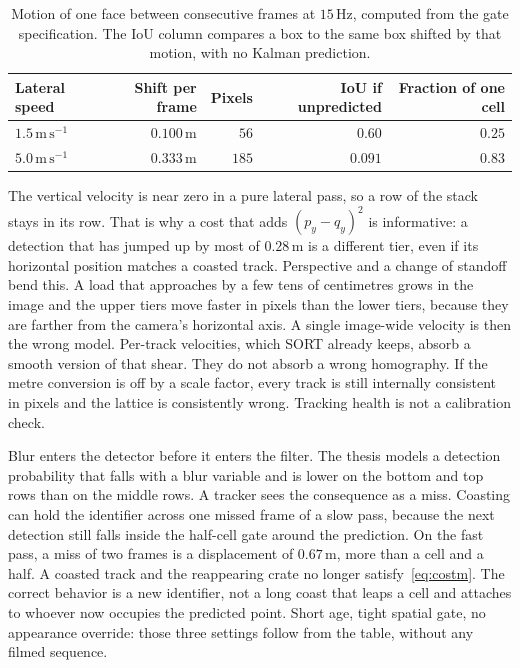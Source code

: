 \documentclass[11pt,a4paper]{article}
\begin{document}
\begin{table}[t]
\centering
\small
\begin{tabular}{lrrrr}
\toprule
Lateral speed & Shift per frame & Pixels & IoU if unpredicted & Fraction of one cell \\
\midrule
$1.5\,\mathrm{m\,s^{-1}}$ & $0.100\,\mathrm{m}$ & $56$ & $0.60$ & $0.25$ \\
$5.0\,\mathrm{m\,s^{-1}}$ & $0.333\,\mathrm{m}$ & $185$ & $0.091$ & $0.83$ \\
\bottomrule
\end{tabular}
\caption{Motion of one face between consecutive frames at $15\,\mathrm{Hz}$, computed from the gate specification. The IoU column compares a box to the same box shifted by that motion, with no Kalman prediction.}
\label{tab:motion}
\end{table}

The vertical velocity is near zero in a pure lateral pass, so a row of the stack stays in its row. That is why a cost that adds $(p_y-q_y)^2$ is informative: a detection that has jumped up by most of $0.28\,\mathrm{m}$ is a different tier, even if its horizontal position matches a coasted track. Perspective and a change of standoff bend this. A load that approaches by a few tens of centimetres grows in the image and the upper tiers move faster in pixels than the lower tiers, because they are farther from the camera's horizontal axis. A single image-wide velocity is then the wrong model. Per-track velocities, which SORT already keeps, absorb a smooth version of that shear. They do not absorb a wrong homography. If the metre conversion is off by a scale factor, every track is still internally consistent in pixels and the lattice is consistently wrong. Tracking health is not a calibration check.

Blur enters the detector before it enters the filter. The thesis models a detection probability that falls with a blur variable and is lower on the bottom and top rows than on the middle rows. A tracker sees the consequence as a miss. Coasting can hold the identifier across one missed frame of a slow pass, because the next detection still falls inside the half-cell gate around the prediction. On the fast pass, a miss of two frames is a displacement of $0.67\,\mathrm{m}$, more than a cell and a half. A coasted track and the reappearing crate no longer satisfy~\eqref{eq:costm}. The correct behavior is a new identifier, not a long coast that leaps a cell and attaches to whoever now occupies the predicted point. Short age, tight spatial gate, no appearance override: those three settings follow from the table, without any filmed sequence.
\end{document}
